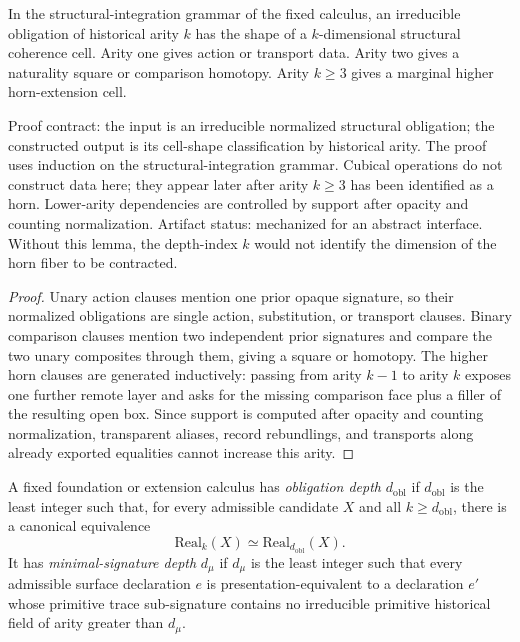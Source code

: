 \documentclass{lmcs}
\begin{document}
\begin{lem}
\label{lem:arity-cell}
In the structural-integration grammar of the fixed calculus, an irreducible obligation of
historical arity \(k\) has the shape of a \(k\)-dimensional structural coherence cell.  Arity
one gives action or transport data.  Arity two gives a naturality square or comparison
homotopy.  Arity \(k\geq 3\) gives a marginal higher horn-extension cell.

Proof contract: the input is an irreducible normalized structural obligation;
the constructed output is its cell-shape classification by historical arity.
The proof uses induction on the structural-integration grammar.  Cubical
operations do not construct data here; they appear later after arity
\(k\geq 3\) has been identified as a horn.  Lower-arity dependencies are
controlled by support after opacity and counting normalization.  Artifact
status: mechanized for an abstract interface.  Without this lemma, the
depth-index \(k\) would not identify the dimension of the horn fiber to be
contracted.
\end{lem}

\begin{proof}
Unary action clauses mention one prior opaque signature, so their normalized obligations are
single action, substitution, or transport clauses.  Binary comparison clauses mention two
independent prior signatures and compare the two unary composites through them, giving a
square or homotopy.  The higher horn clauses are generated inductively: passing from arity
\(k-1\) to arity \(k\) exposes one further remote layer and asks for the missing comparison
face plus a filler of the resulting open box.  Since support is computed after opacity and
counting normalization, transparent aliases, record rebundlings, and transports along already
exported equalities cannot increase this arity.
\end{proof}

\begin{defi}
\label{def:two-depths}
A fixed foundation or extension calculus has \emph{obligation depth} \(d_{\mathrm{obl}}\) if
\(d_{\mathrm{obl}}\) is the least integer such that, for every admissible candidate \(X\) and
all \(k\geq d_{\mathrm{obl}}\), there is a canonical equivalence
\[
  \mathrm{Real}_k(X) \simeq \mathrm{Real}_{d_{\mathrm{obl}}}(X).
\]
It has \emph{minimal-signature depth} \(d_\mu\) if \(d_\mu\) is the least integer such that
every admissible surface declaration \(e\) is presentation-equivalent to a declaration \(e'\)
whose primitive trace sub-signature contains no irreducible primitive historical field of
arity greater than \(d_\mu\).
\end{defi}
\end{document}
